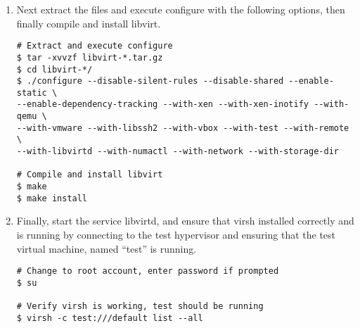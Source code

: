 \begin{enumerate}
\item	Next extract the files and execute configure with the following options, then finally compile and install libvirt.

\lstset{language=bash,caption=Compile and Install libvirt}
\begin{lstlisting}
# Extract and execute configure
$ tar -xvvzf libvirt-*.tar.gz
$ cd libvirt-*/
$ ./configure --disable-silent-rules --disable-shared --enable-static \
--enable-dependency-tracking --with-xen --with-xen-inotify --with-qemu \
--with-vmware --with-libssh2 --with-vbox --with-test --with-remote \
--with-libvirtd --with-numactl --with-network --with-storage-dir

# Compile and install libvirt
$ make 
$ make install
\end{lstlisting}

\item 	Finally, start the service libvirtd, and ensure that virsh installed correctly and is running by 
		connecting to the test hypervisor and ensuring that the test virtual machine, named ``test'' is running.

\lstset{language=bash,caption=Verify virsh was Installed Properly}
\begin{lstlisting}
# Change to root account, enter password if prompted
$ su

# Verify virsh is working, test should be running
$ virsh -c test:///default list --all
\end{lstlisting}
\end{enumerate}




